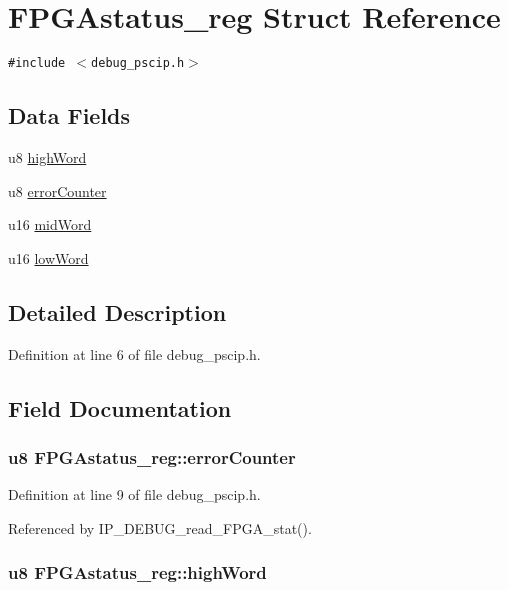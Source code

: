 \hypertarget{struct_f_p_g_astatus__reg}{
\section{FPGAstatus\_\-reg Struct Reference}
\label{struct_f_p_g_astatus__reg}
}
{\tt \#include $<$debug\_\-pscip.h$>$}

\subsection*{Data Fields}
\begin{CompactItemize}
\item 
u8 \hyperlink{struct_f_p_g_astatus__reg_94404b05e60c2007a5e5d33c5943c8e7}{highWord}
\item 
u8 \hyperlink{struct_f_p_g_astatus__reg_dff67a3d368b663ffb6fa1b604bb6c59}{errorCounter}
\item 
u16 \hyperlink{struct_f_p_g_astatus__reg_9bd5d9537f9745dccf8f94ea35a78ba6}{midWord}
\item 
u16 \hyperlink{struct_f_p_g_astatus__reg_ee4f129b3e11d331d362013695bc28b3}{lowWord}
\end{CompactItemize}


\subsection{Detailed Description}


Definition at line 6 of file debug\_\-pscip.h.

\subsection{Field Documentation}
\hypertarget{struct_f_p_g_astatus__reg_dff67a3d368b663ffb6fa1b604bb6c59}{
\subsubsection[{errorCounter}]{\setlength{\rightskip}{0pt plus 5cm}u8 {\bf FPGAstatus\_\-reg::errorCounter}}}
\label{struct_f_p_g_astatus__reg_dff67a3d368b663ffb6fa1b604bb6c59}




Definition at line 9 of file debug\_\-pscip.h.

Referenced by IP\_\-DEBUG\_\-read\_\-FPGA\_\-stat().\hypertarget{struct_f_p_g_astatus__reg_94404b05e60c2007a5e5d33c5943c8e7}{
\subsubsection[{highWord}]{\setlength{\rightskip}{0pt plus 5cm}u8 {\bf FPGAstatus\_\-reg::highWord}}}
\label{struct_f_p_g_astatus__reg_94404b05e60c2007a5e5d33c5943c8e7}




